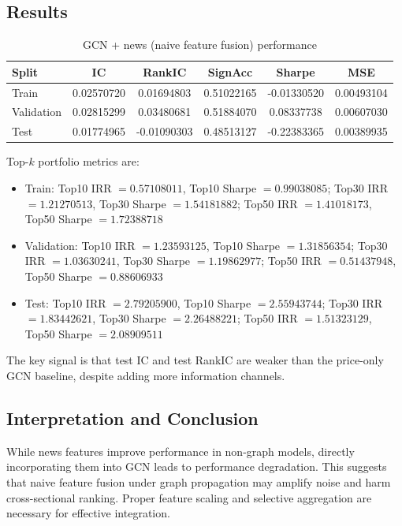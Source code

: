 \subsection{Results}

\begin{table}[htbp]
\centering
\caption{GCN + news (naive feature fusion) performance}
\label{tab:gcn-news-results}
\begin{tabular}{lccccc}
\hline
Split & IC & RankIC & SignAcc & Sharpe & MSE \\
\hline
Train & 0.02570720 & 0.01694803 & 0.51022165 & -0.01330520 & 0.00493104 \\
Validation & 0.02815299 & 0.03480681 & 0.51884070 & 0.08337738 & 0.00607030 \\
Test & 0.01774965 & -0.01090303 & 0.48513127 & -0.22383365 & 0.00389935 \\
\hline
\end{tabular}
\end{table}

Top-$k$ portfolio metrics are:
\begin{itemize}
\item Train: Top10 IRR $=0.57108011$, Top10 Sharpe $=0.99038085$; Top30 IRR $=1.21270513$, Top30 Sharpe $=1.54181882$; Top50 IRR $=1.41018173$, Top50 Sharpe $=1.72388718$
\item Validation: Top10 IRR $=1.23593125$, Top10 Sharpe $=1.31856354$; Top30 IRR $=1.03630241$, Top30 Sharpe $=1.19862977$; Top50 IRR $=0.51437948$, Top50 Sharpe $=0.88606933$
\item Test: Top10 IRR $=2.79205900$, Top10 Sharpe $=2.55943744$; Top30 IRR $=1.83442621$, Top30 Sharpe $=2.26488221$; Top50 IRR $=1.51323129$, Top50 Sharpe $=2.08909511$
\end{itemize}

The key signal is that test IC and test RankIC are weaker than the price-only GCN baseline, despite adding more information channels.

\subsection{Interpretation and Conclusion}

While news features improve performance in non-graph models, directly incorporating them into GCN leads to performance degradation. This suggests that naive feature fusion under graph propagation may amplify noise and harm cross-sectional ranking. Proper feature scaling and selective aggregation are necessary for effective integration.

